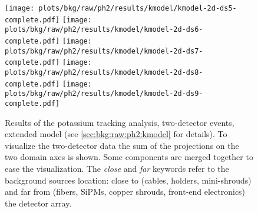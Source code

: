 \begin{figure}
  \centering
  \texttt{[image: plots/bkg/raw/ph2/results/kmodel/kmodel-2d-ds5-complete.pdf]}
  \texttt{[image: plots/bkg/raw/ph2/results/kmodel/kmodel-2d-ds6-complete.pdf]}\vspace{10pt}
  \texttt{[image: plots/bkg/raw/ph2/results/kmodel/kmodel-2d-ds7-complete.pdf]}
  \texttt{[image: plots/bkg/raw/ph2/results/kmodel/kmodel-2d-ds8-complete.pdf]}\vspace{10pt}
  \texttt{[image: plots/bkg/raw/ph2/results/kmodel/kmodel-2d-ds9-complete.pdf]}
  \begin{minipage}[b][5.3cm][c]{0.45\textwidth}
    \hspace{15pt}%
    \parbox{0.91\textwidth}{%
      \caption{%
        Results of the potassium tracking analysis, two-detector events, extended model (see
        \cref{sec:bkg:raw:ph2:kmodel} for details). To visualize the two-detector data the
        sum of the projections on the two domain axes is shown. Some components are merged
        together to ease the visualization. The \emph{close} and \emph{far} keywords refer
        to the background sources location: close to (cables, holders, mini-shrouds) and far
        from (fibers, SiPMs, copper shrouds, front-end electronics) the detector array.
      }\label{fig:bkg:raw:ph2:kmodel:extended:results:M2}
    }
  \end{minipage}
\end{figure}

